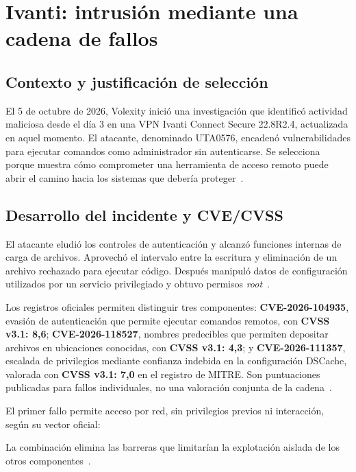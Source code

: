 \chapter{Ivanti: intrusión mediante una cadena de fallos}
\label{chap:incidente2}

\section{Contexto y justificación de selección}
El 5 de octubre de 2026, Volexity inició una investigación
que identificó actividad maliciosa desde el día 3 en una VPN
Ivanti Connect Secure 22.8R2.4, actualizada en aquel momento.
El atacante, denominado UTA0576, encadenó vulnerabilidades
para ejecutar comandos como administrador sin autenticarse.
Se selecciona porque muestra cómo comprometer una herramienta
de acceso remoto puede abrir el camino hacia los sistemas
que debería proteger~\cite{volexity2026ivanti}.

\section{Desarrollo del incidente y CVE/CVSS}
El atacante eludió los controles de autenticación y alcanzó
funciones internas de carga de archivos. Aprovechó el intervalo
entre la escritura y eliminación de un archivo rechazado para
ejecutar código. Después manipuló datos de configuración
utilizados por un servicio privilegiado y obtuvo permisos
\textit{root}~\cite{volexity2026ivanti}.

Los registros oficiales permiten distinguir tres componentes:
\textbf{CVE-2026-104935}, evasión de autenticación que permite
ejecutar comandos remotos, con \textbf{CVSS v3.1: 8,6};
\textbf{CVE-2026-118527}, nombres predecibles que permiten
depositar archivos en ubicaciones conocidas, con
\textbf{CVSS v3.1: 4,3}; y \textbf{CVE-2026-111357},
escalada de privilegios mediante confianza indebida en la
configuración DSCache, valorada con \textbf{CVSS v3.1: 7,0}
en el registro de MITRE. Son puntuaciones publicadas para
fallos individuales, no una valoración conjunta de la
cadena~\cite{cve2026ivanti104935,cve2026ivanti118527,
    cve2026ivanti111357}.

El primer fallo permite acceso por red, sin privilegios
previos ni interacción, según su vector oficial:\par
{}\par
\noindent La combinación elimina las barreras que limitarían
la explotación aislada de los otros
componentes~\cite{cve2026ivanti104935}.

